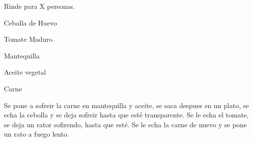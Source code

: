 
Rinde para X personas.\\

\begin{ingredientes}
\item Cebolla de Huevo
\item Tomate Maduro
\item Mantequilla
\item Aceite vegetal
\item Carne
\end{ingredientes}
\preparacion
Se pone a sofreir la carne en mantequilla y aceite, se saca despues en un plato, se echa la cebolla y se deja sofreir hasta que esté transparente. Se le echa el tomate, se deja un rator sofirendo, hasta que esté. Se le echa la carne de nuevo y se pone un rato a fuego lento.

